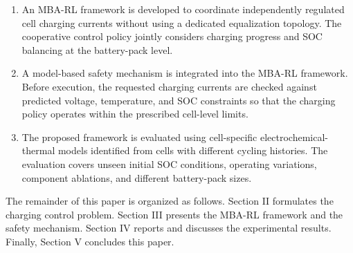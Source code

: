 \begin{enumerate}

    \item An MBA-RL framework is developed to coordinate independently regulated cell charging currents without using a dedicated equalization topology. The cooperative control policy jointly considers charging progress and SOC balancing at the battery-pack level.

    \item A model-based safety mechanism is integrated into the MBA-RL framework. Before execution, the requested charging currents are checked against predicted voltage, temperature, and SOC constraints so that the charging policy operates within the prescribed cell-level limits.

    \item The proposed framework is evaluated using cell-specific electrochemical-thermal models identified from cells with different cycling histories. The evaluation covers unseen initial SOC conditions, operating variations, component ablations, and different battery-pack sizes.

\end{enumerate}

The remainder of this paper is organized as follows. Section II formulates the charging control problem. Section III presents the MBA-RL framework and the safety mechanism. Section IV reports and discusses the experimental results. Finally, Section V concludes this paper.
